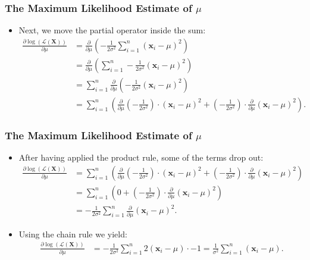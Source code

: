\begin{frame}
  \frametitle{The Maximum Likelihood Estimate of $\mu$}
  \begin{itemize}
  \item Next, we move the partial operator inside the sum:
    \begin{align}
      \frac{\partial \log\left(\mathcal{L}(\mathbf{X})\right)}{\partial \mu} &= \frac{\partial}{\partial\mu}\left(-\frac{1}{2\sigma^2} \sum_{i=1}^{n} (\mathbf{x}_i-\mu)^2 \right) \\
                                                                             &= \frac{\partial}{\partial\mu}\left(\sum_{i=1}^{n}-\frac{1}{2\sigma^2} (\mathbf{x}_i-\mu)^2 \right)\\
                                                                             &= \sum_{i=1}^{n} \frac{\partial}{\partial\mu}\left(-\frac{1}{2\sigma^2} (\mathbf{x}_i-\mu)^2\right)\\
                                                                             &= \sum_{i=1}^{n} \left(\frac{\partial}{\partial\mu}\left(-\frac{1}{2\sigma^2}\right) \cdot (\mathbf{x}_i - \mu)^2 + \left( - \frac{1}{2\sigma^2} \right) \cdot \frac{\partial}{\partial\mu} (\mathbf{x}_i-\mu)^2\right).
    \end{align}
  \end{itemize}
\end{frame}


\begin{frame}
  \frametitle{The Maximum Likelihood Estimate of $\mu$}
  \begin{itemize}
  \item After having applied the product rule, some of the terms drop out:
    \begin{align}
      \frac{\partial \log\left(\mathcal{L}(\mathbf{X})\right)}{\partial \mu} &= \sum_{i=1}^{n} \left(\frac{\partial}{\partial\mu}\left(-\frac{1}{2\sigma^2}\right) \cdot (\mathbf{x}_i - \mu)^2 + \left( - \frac{1}{2\sigma^2} \right) \cdot \frac{\partial}{\partial\mu} (\mathbf{x}_i-\mu)^2\right) \\
                                                                             &= \sum_{i=1}^{n} \left(0 + \left( - \frac{1}{2\sigma^2} \right) \cdot \frac{\partial}{\partial\mu} (\mathbf{x}_i-\mu)^2\right)\\
                                                                             &= - \frac{1}{2\sigma^2} \sum_{i=1}^{n} \frac{\partial}{\partial\mu} (\mathbf{x}_i-\mu)^2.
    \end{align}
  \item Using the chain rule we yield:
    \begin{align}
      \frac{\partial \log\left(\mathcal{L}(\mathbf{X})\right)}{\partial \mu} &= - \frac{1}{2\sigma^2} \sum_{i=1}^{n}  2(\mathbf{x}_i-\mu) \cdot -1 = \frac{1}{\sigma^2} \sum_{i=1}^{n}  (\mathbf{x}_i-\mu).
    \end{align}
  \end{itemize}
\end{frame}


